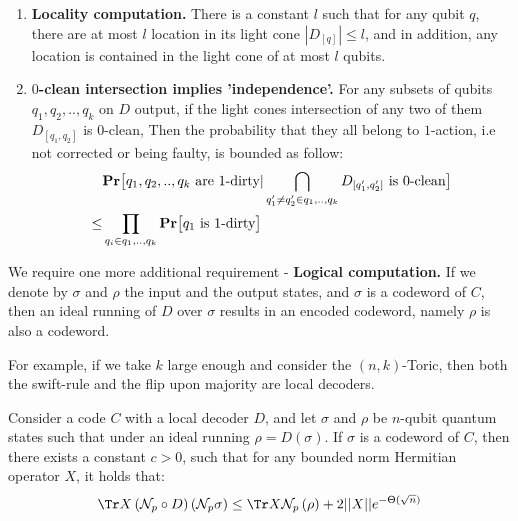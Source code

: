 \begin{definition}
\begin{enumerate}
    \item \textbf{Locality computation.} There is a constant $l$ such that for any qubit $q$, there are at most $l$ location in its light cone $ |D_{[q]}| \le l $, and in addition, any location is contained in the light cone of at most $l$ qubits.  
    \item \textbf{$0$-clean intersection implies 'independence'. } For any subsets of qubits $q_{1},q_{2},..,q_{k}$ on $D$ output, if the light cones intersection of any two of them $D_{[q_{1},q_{2}]}$ is $0$-clean, Then the probability that they all belong to $1$-action, i.e not corrected or being faulty, is bounded as follow:  
      \begin{equation*}
        \begin{split}
          & \mathbf{Pr} \big[  q_{1},q_{2},..,q_{k} \text{ are } 1\text{-dirty}   | \bigcap_{q^{\prime}_{1}\neq q^{\prime}_{2}\in q_{1},..,q_{k}} D_{[q^{\prime}_{1},q^{\prime}_{2}]} \text{ is } 0\text{-clean} \big] \\ 
          \le & \prod_{q_{i} \in q_{1},..,q_{k}} \mathbf{Pr} \big[  q_{1} \text{ is } 1 \text{-dirty}  \big] 
        \end{split}
      \end{equation*}
  \end{enumerate}
We require one more additional requirement - \textbf{Logical computation.} If we denote by $\sigma$ and $\rho$ the input and the output states, and $\sigma$ is a codeword of $C$, then an ideal running of $D$ over $\sigma$ results in an encoded codeword, namely $\rho$ is also a codeword.
  


For example, if we take $k$ large enough and consider the $(n,k)$-Toric, then both the swift-rule and the flip upon majority are local decoders.

\end{definition}



\begin{lemma} 
  \label{lemma:steplemma}
  Consider a code $C$ with a local decoder $D$, and let $\sigma$ and $\rho$ be $n$-qubit quantum states such that under an ideal running $\rho = D \left( \sigma  \right) $. If $\sigma$ is a codeword of $C$, then there exists a constant $c > 0$, such that for any bounded norm Hermitian operator $X$, it holds that:
    \begin{equation*}
      \Tr X  \left( \mathcal{N}_{p} \circ D \right)   \left( \mathcal{N}_{p} \sigma \right)  \le \Tr X  \mathcal{N}_{p} \left( \rho \right)  + 2||X|| e^{- \Theta( \sqrt{n}) }
    \end{equation*}
\end{lemma}



